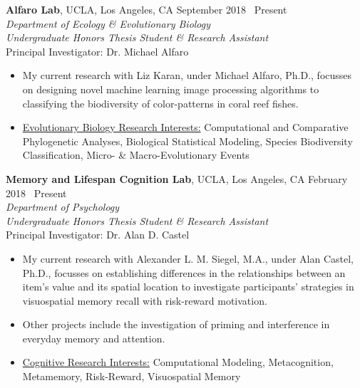 \documentclass[margin]{res}
\begin{document}
\begin{resume}
		{\bf Alfaro Lab}, UCLA, Los Angeles, CA  \hfill September 2018 \textendash\ Present \\
		{\sl Department of Ecology \& Evolutionary Biology} \\
		{\it Undergraduate Honors Thesis Student \& Research Assistant} \\
		Principal Investigator: Dr. Michael Alfaro
		\begin{itemize} \itemsep -2pt
			\item My current research with Liz Karan, under Michael Alfaro, Ph.D., focusses on designing novel machine learning image processing algorithms to classifying the biodiversity of color-patterns in coral reef fishes. 
			\item \underline{Evolutionary Biology Research Interests:} Computational and Comparative Phylogenetic Analyses, Biological Statistical Modeling, Species Biodiversity Classification, Micro- \& Macro-Evolutionary Events
		\end{itemize}
		
		{\bf Memory and Lifespan Cognition Lab}, UCLA, Los Angeles, CA  \hfill February 2018 \textendash\ Present \\
		{\sl Department of Psychology} \\
		{\it Undergraduate Honors Thesis Student \& Research Assistant} \\
		Principal Investigator: Dr. Alan D. Castel
		\begin{itemize} \itemsep -2pt
			\item My current research with Alexander L. M. Siegel, M.A., under Alan Castel, Ph.D., focusses on establishing differences in the relationships between an item's value and its spatial location to investigate participants' strategies in visuospatial memory recall with risk-reward motivation. 
			\item Other projects include the investigation of priming and interference in everyday memory and attention.
			\item \underline{Cognitive Research Interests:} Computational Modeling, Metacognition, Metamemory, Risk-Reward, Visuospatial Memory
		\end{itemize}
		

\end{resume}
\end{document}
